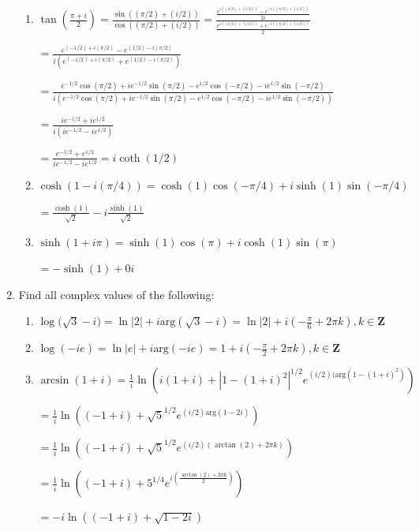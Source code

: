 \documentclass{article}
\newcommand{\Z}{\mathbf{Z}}
\begin{document}
\begin{enumerate}
\begin{enumerate}
		\item $\tan{(\frac{\pi+i}{2})} = \frac{ \sin{((\pi/2) + (i/2))} }{ \cos{((\pi/2) + (i/2))}} = \frac{ \frac{e^{i((\pi/2)+(i/2))} - e^{-i((\pi/2) + (i/2))}}{2i} }{ \frac{e^{i((\pi/2)+(i/2))} + e^{-i((\pi/2) + (i/2))}}{2} }$
		
		$= \frac{e^{(-1/2)+i(\pi/2)}-e^{(1/2)-i(\pi/2)}}{i(e^{(-1/2)+i(\pi/2)}+e^{(1/2)-i(\pi/2)})}$
		
		$= \frac{e^{-1/2}\cos{(\pi/2)}+ie^{-1/2}\sin{(\pi/2)}-e^{1/2}\cos{(-\pi/2)}-ie^{1/2}\sin{(-\pi/2)}}{i(e^{-1/2}\cos{(\pi/2)}+ie^{-1/2}\sin{(\pi/2)}-e^{1/2}\cos{(-\pi/2)}-ie^{1/2}\sin{(-\pi/2)})}$
		
		$= \frac{ie^{-1/2}+ie^{1/2}}{i(ie^{-1/2}-ie^{1/2})}$
		
		$= \frac{e^{-1/2}+e^{1/2}}{ie^{-1/2}-ie^{1/2}}=i\coth{(1/2)}$
		
		\item $\cosh{(1-i(\pi/4))}= \cosh{(1)}\cos{(-\pi/4)}+i\sinh{(1)}\sin{(-\pi/4)}$
		
		$= \frac{\cosh{(1)}}{\sqrt{2}}-i\frac{\sinh{(1)}}{\sqrt{2}}$
		
		\item $\sinh{(1+i\pi)}=\sinh{(1)}\cos{(\pi)}+i\cosh{(1)}\sin{(\pi)} $
		
		$= -\sinh{(1)}+0i$
	\end{enumerate}
	
	\item Find all complex values of the following:
		\begin{enumerate}
			\item $\log{(\sqrt{3}-i})=\ln|2|+i\text{arg}(\sqrt{3}-i)=\ln|2|+i(-\frac{\pi}{6}+2\pi k), k \in \Z$
			
			\item $\log{(-ie)}=\ln|e|+i\text{arg}(-ie)=1+i(-\frac{\pi}{2}+2\pi k), k \in \Z$
			
			\item $\arcsin{(1+i)} = \frac{1}{i}\ln(i(1+i)+|1-(1+i)^2|^{1/2}e^{(i/2)(\text{arg}(1-(1+i)^2)})$
			
			$=\frac{1}{i}\ln((-1+i)+\sqrt{5}^{1/2}e^{(i/2)\text{arg}(1-2i)})$
			
			$=\frac{1}{i}\ln((-1+i)+\sqrt{5}^{1/2}e^{(i/2)(\arctan{(2)}+2\pi k)})$
			
			$=\frac{1}{i}\ln((-1+i)+5^{1/4}e^{i(\frac{\arctan{(2)}+2\pi k}{2})})$
			
			$=-i\ln((-1+i)+\sqrt{1-2i})$
		\end{enumerate}
		

\end{enumerate}
\end{document}
